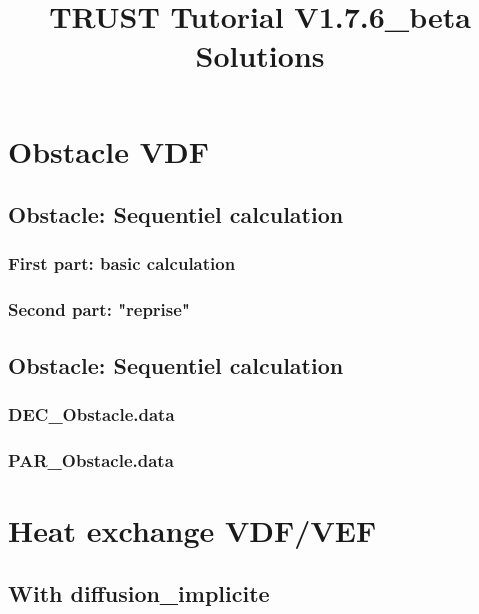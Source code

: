 \documentclass[english]{article}
\begin{document}
\title{TRUST Tutorial V1.7.6_beta Solutions}
\maketitle
\tableofcontents{}
\newpage

\section{Obstacle VDF}
\subsection{Obstacle: Sequentiel calculation}
\subsubsection{First part: basic calculation}

\subsubsection{Second part: "reprise"}


\subsection{Obstacle: Sequentiel calculation}
\subsubsection{DEC\_Obstacle.data}

\subsubsection{PAR\_Obstacle.data}



\section{Heat exchange VDF/VEF}
\subsection{With diffusion\_implicite}

\end{document}
